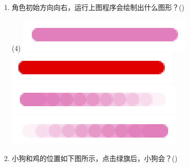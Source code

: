 \documentclass[10pt, a4paper]{article}
\newcommand{\hq}{\hfill(\qquad)}
\begin{document}
\begin{enumerate}
        \item 角色初始方向向右，运行上图程序会绘制出什么图形？\hq
        \begin{tasks}(4)
            \task \includegraphics[width=.15\textwidth]{figure/12a.png}
            \task \includegraphics[width=.15\textwidth]{figure/12b.png}
            \task \includegraphics[width=.15\textwidth]{figure/12c.png}
            \task \includegraphics[width=.15\textwidth]{figure/12d.png}
        \end{tasks}

        \item 小狗和鸡的位置如下图所示，点击绿旗后，小狗会？\hq
        

\end{enumerate}
\end{document}
